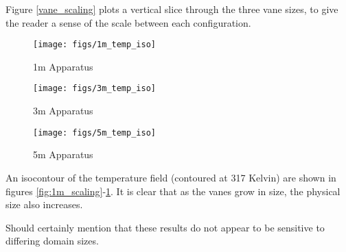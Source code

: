 \documentclass[english]{article}
\begin{document}
Figure \ref{vane_scaling} plots a vertical slice through the three vane sizes, to give the reader a sense of the 
scale between each configuration.

\begin{figure}[!htb]
  \texttt{[image: figs/1m\_temp\_iso]}
  \caption{1m Apparatus}\label{fig:1m_scaling}
\endminipage\hfill
{}
  \texttt{[image: figs/3m\_temp\_iso]}
  \caption{3m Apparatus}\label{fig:3m_scaling}
\endminipage\hfill
{}%
  \texttt{[image: figs/5m\_temp\_iso]}
  \caption{5m Apparatus}\label{fig:5m_scaling}
\endminipage
\end{figure}

An isocontour of the temperature field (contoured at 317 Kelvin) are shown in figures \ref{fig:1m_scaling}-\ref{fig:5m_scaling}. 
It is clear that as the vanes grow in size, the physical size also increases. 

Should certainly mention that these results do not appear to be sensitive to differing domain sizes. 

%
%

\end{document}
